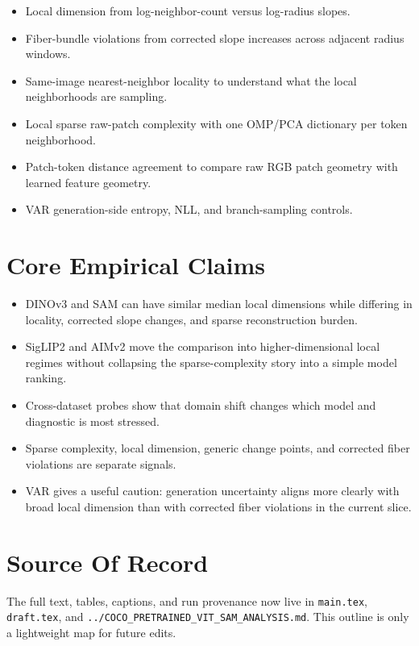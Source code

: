 \documentclass{article}
\begin{document}
\begin{itemize}[leftmargin=1.5em]
\item Local dimension from log-neighbor-count versus log-radius slopes.
\item Fiber-bundle violations from corrected slope increases across adjacent radius windows.
\item Same-image nearest-neighbor locality to understand what the local neighborhoods are sampling.
\item Local sparse raw-patch complexity with one OMP/PCA dictionary per token neighborhood.
\item Patch-token distance agreement to compare raw RGB patch geometry with learned feature geometry.
\item VAR generation-side entropy, NLL, and branch-sampling controls.
\end{itemize}

\section*{Core Empirical Claims}

\begin{itemize}[leftmargin=1.5em]
\item DINOv3 and SAM can have similar median local dimensions while differing in locality, corrected slope changes, and sparse reconstruction burden.
\item SigLIP2 and AIMv2 move the comparison into higher-dimensional local regimes without collapsing the sparse-complexity story into a simple model ranking.
\item Cross-dataset probes show that domain shift changes which model and diagnostic is most stressed.
\item Sparse complexity, local dimension, generic change points, and corrected fiber violations are separate signals.
\item VAR gives a useful caution: generation uncertainty aligns more clearly with broad local dimension than with corrected fiber violations in the current slice.
\end{itemize}

\section*{Source Of Record}

The full text, tables, captions, and run provenance now live in \texttt{main.tex}, \texttt{draft.tex}, and \texttt{../COCO\_PRETRAINED\_VIT\_SAM\_ANALYSIS.md}. This outline is only a lightweight map for future edits.
\end{document}
